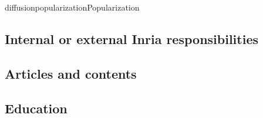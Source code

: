 \documentclass{ra2018}
\begin{document}
\begin{module}{diffusion}{popularization}{Popularization}

\subsection{Internal or external Inria responsibilities}

\subsection{Articles and contents}

\subsection{Education}



\end{module}
\end{document}
